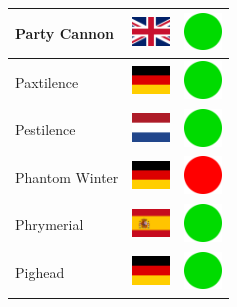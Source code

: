 \documentclass[12pt, a4paper, twoside]{report}
\begin{document}
\begin{center}
\begin{longtable}{|p{5cm}|p{2cm}|p{2cm}|}
Party Cannon & \includegraphics[width=1cm]{4x3/gb} & \includegraphics[width=1cm]{likes/y} \\ \hline
Paxtilence & \includegraphics[width=1cm]{4x3/de} & \includegraphics[width=1cm]{likes/y} \\ \hline
Pestilence & \includegraphics[width=1cm]{4x3/nl} & \includegraphics[width=1cm]{likes/y} \\ \hline
Phantom Winter & \includegraphics[width=1cm]{4x3/de} & \includegraphics[width=1cm]{likes/n} \\ \hline
Phrymerial & \includegraphics[width=1cm]{4x3/es} & \includegraphics[width=1cm]{likes/y} \\ \hline
Pighead & \includegraphics[width=1cm]{4x3/de} & \includegraphics[width=1cm]{likes/y} \\ \hline

\end{longtable}
\end{center}
\end{document}
